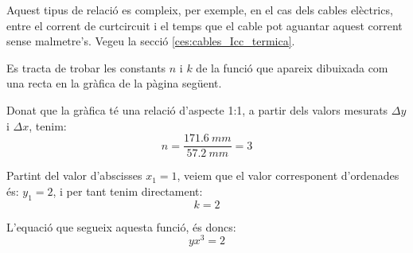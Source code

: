 Aquest tipus de relació es compleix, per exemple, en el cas dels cables elèctrics, entre el corrent de curtcircuit i el temps que el cable pot aguantar aquest corrent sense malmetre's. Vegeu la secció \vref{ces:cables_Icc_termica}.


\begin{exemple}
    Es tracta de trobar les constants $n$ i $k$ de la funció que apareix dibuixada com una recta en la gràfica de la pàgina següent.

     Donat que la gràfica té una relació d'aspecte 1:1, a partir dels valors mesurats $\Delta{}y$ i $\Delta{}x$, tenim:
    \[
        n = \frac{\SI{171,6}{mm}}{\SI{57,2}{mm}} = 3
    \]

    Partint del valor d'abscisses $x_1=1$, veiem que el valor corresponent d'ordenades és: $y_1=2$, i per tant tenim directament:
    \[
        k = 2
    \]

    L'equació que segueix aquesta funció, és doncs:
    \[
        y x^3 = 2
    \]

   \begin{center}
        
   \end{center}

\end{exemple}

